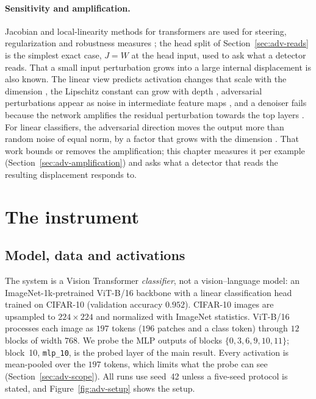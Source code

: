 \documentclass[../ppgc-tese.tex]{subfiles}
\begin{document}
\paragraph*{Sensitivity and amplification.}
Jacobian and local-linearity methods for transformers are used for steering,
regularization and robustness measures
\cite{skifstad2026local_linearity,martnishn2026dreg_jacobian,zhang2026fisher_robustness,yudin2025attention_lipschitz};
the head split of Section~\ref{sec:adv-reads} is the simplest exact case,
$J{=}W$ at the head input, used to ask what a detector reads. That a small
input perturbation grows into a large internal displacement is also known. The
linear view predicts activation changes that scale with the dimension
\cite{goodfellow2015fgsm}, the Lipschitz constant can grow with depth
\cite{cisse2017parseval}, adversarial perturbations appear as noise in
intermediate feature maps \cite{xie2019feature_denoising}, and a denoiser fails
because the network amplifies the residual perturbation towards the top layers
\cite{liao2018hgd_denoiser}. For linear classifiers, the adversarial direction
moves the output more than random noise of equal norm, by a factor that grows
with the dimension \cite{fawzi2016robustness_adversarial_to_random_noise}. That
work bounds or removes the amplification; this chapter measures it per example
(Section~\ref{sec:adv-amplification}) and asks what a detector that reads the
resulting displacement responds to. %

\section{The instrument}
\label{sec:adv-instrument}

\subsection{Model, data and activations}
\label{sec:adv-models}
The system is a Vision Transformer \emph{classifier}, not a vision--language
model: an ImageNet-1k-pretrained ViT-B/16 backbone
\cite{deng2009imagenet,dosovitskiy2021vit} with a linear classification head
trained on CIFAR-10 \cite{krizhevsky2009cifar} (validation accuracy $0.952$).
CIFAR-10 images are upsampled to $224\times224$ and normalized with ImageNet
statistics.
ViT-B/16 processes each image as $197$ tokens ($196$ patches and a class token)
through $12$ blocks of width $768$. We probe the MLP outputs of blocks
$\{0,3,6,9,10,11\}$; block~10, \texttt{mlp\_10}, is the probed layer of the
main result. Every activation is mean-pooled over the $197$ tokens, which
limits what the probe can see (Section~\ref{sec:adv-scope}). All runs use
seed~42 unless a five-seed protocol is stated, and
Figure~\ref{fig:adv-setup} shows the setup.
\end{document}
